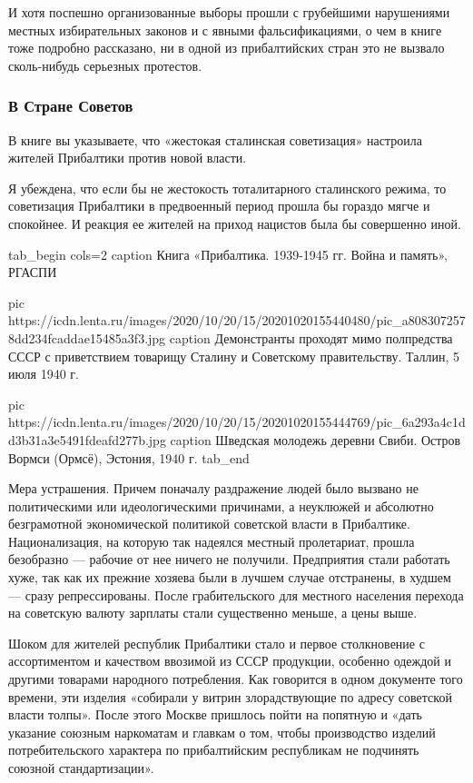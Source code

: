 И хотя поспешно организованные выборы прошли с грубейшими нарушениями местных
избирательных законов и с явными фальсификациями, о чем в книге тоже подробно
рассказано, ни в одной из прибалтийских стран это не вызвало сколь-нибудь
серьезных протестов.

\subsubsection{В Стране Советов}

В книге вы указываете, что «жестокая сталинская советизация» настроила жителей
Прибалтики против новой власти.

Я убеждена, что если бы не жестокость тоталитарного сталинского режима, то
советизация Прибалтики в предвоенный период прошла бы гораздо мягче и
спокойнее. И реакция ее жителей на приход нацистов была бы совершенно иной.

\ifcmt
tab_begin cols=2
	caption Книга «Прибалтика. 1939-1945 гг. Война и память», РГАСПИ

	pic https://icdn.lenta.ru/images/2020/10/20/15/20201020155440480/pic_a8083072578dd234fcaddae15485a3f3.jpg
	caption Демонстранты проходят мимо полпредства СССР с приветствием товарищу Сталину и Советскому правительству. Таллин, 5 июля 1940 г. 

	pic https://icdn.lenta.ru/images/2020/10/20/15/20201020155444769/pic_6a293a4c1dd3b31a3e5491fdeafd277b.jpg
	caption Шведская молодежь деревни Свиби. Остров Вормси (Ормсё), Эстония, 1940 г.
tab_end
\fi


Мера устрашения. Причем поначалу раздражение людей было вызвано не
политическими или идеологическими причинами, а неуклюжей и абсолютно
безграмотной экономической политикой советской власти в Прибалтике.
Национализация, на которую так надеялся местный пролетариат, прошла безобразно
— рабочие от нее ничего не получили. Предприятия стали работать хуже, так как
их прежние хозяева были в лучшем случае отстранены, в худшем — сразу
репрессированы. После грабительского для местного населения перехода на
советскую валюту зарплаты стали существенно меньше, а цены выше.

Шоком для жителей республик Прибалтики стало и первое столкновение с
ассортиментом и качеством ввозимой из СССР продукции, особенно одеждой и
другими товарами народного потребления. Как говорится в одном документе того
времени, эти изделия «собирали у витрин злорадствующие по адресу советской
власти толпы». После этого Москве пришлось пойти на попятную и «дать указание
союзным наркоматам и главкам о том, чтобы производство изделий потребительского
характера по прибалтийским республикам не подчинять союзной стандартизации».

